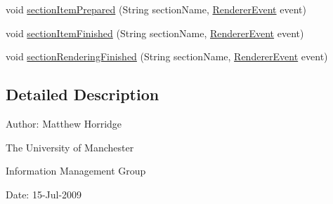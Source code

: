 \begin{DoxyCompactItemize}
\item 
void \hyperlink{interfaceuk_1_1ac_1_1manchester_1_1cs_1_1owl_1_1owlapi_1_1mansyntaxrenderer_1_1_renderer_listener_af99088337cfaf8bfb86f57ca46fc9a0d}{section\-Item\-Prepared} (String section\-Name, \hyperlink{classuk_1_1ac_1_1manchester_1_1cs_1_1owl_1_1owlapi_1_1mansyntaxrenderer_1_1_renderer_event}{Renderer\-Event} event)
\item 
void \hyperlink{interfaceuk_1_1ac_1_1manchester_1_1cs_1_1owl_1_1owlapi_1_1mansyntaxrenderer_1_1_renderer_listener_a1caf8cd1a0a2df48ca3ef591abd695c3}{section\-Item\-Finished} (String section\-Name, \hyperlink{classuk_1_1ac_1_1manchester_1_1cs_1_1owl_1_1owlapi_1_1mansyntaxrenderer_1_1_renderer_event}{Renderer\-Event} event)
\item 
void \hyperlink{interfaceuk_1_1ac_1_1manchester_1_1cs_1_1owl_1_1owlapi_1_1mansyntaxrenderer_1_1_renderer_listener_af0d3589c1e026fcaf85b44675db8597a}{section\-Rendering\-Finished} (String section\-Name, \hyperlink{classuk_1_1ac_1_1manchester_1_1cs_1_1owl_1_1owlapi_1_1mansyntaxrenderer_1_1_renderer_event}{Renderer\-Event} event)
\end{DoxyCompactItemize}


\subsection{Detailed Description}
Author\-: Matthew Horridge\par
 The University of Manchester\par
 Information Management Group\par
 Date\-: 15-\/\-Jul-\/2009 

